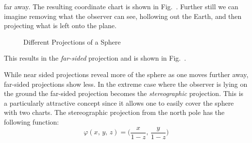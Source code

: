 \documentclass{book}                                                           %
\begin{document}
                far away. The resulting coordinate chart is shown in
                Fig.~. Further still we can imagine
                removing what the observer can see, hollowing out the Earth, and
                then projecting what is left onto the plane.
                \begin{figure}
                    \centering
                    \captionsetup{type=figure}
                    \begin{subfigure}[b]{0.49\textwidth}
                        \centering
                        \captionsetup{type=figure}
                        \label{fig:Near_Sided_Proj}
                    \end{subfigure}
                    \begin{subfigure}[b]{0.49\textwidth}
                        \centering
                        \captionsetup{type=figure}
                        \label{fig:Far_Sided_Proj}
                    \end{subfigure}
                    \caption{Different Projections of a Sphere}
                \end{figure}
                This results in the \textit{far-sided} projection and is shown
                in Fig.~.
                \par\vspace{1ex}
                \begin{minipage}[t]{0.52\textwidth}
                    While near sided projections reveal more of the sphere as
                    one moves further away, far-sided projections show less. In
                    the extreme case where the observer is lying on the ground
                    the far-sided projection becomes the \textit{stereographic}
                    projection. This is a particularly attractive concept since
                    it allows one to easily cover the sphere with two charts.
                    The stereographic projection from the north pole has the
                    following function:
                    \begin{equation}
                        \varphi(x,\,y,\,z)=\Big(\frac{x}{1-z},\,\frac{y}{1-z}\Big)
                    \end{equation}
                \end{minipage}
\end{document}
